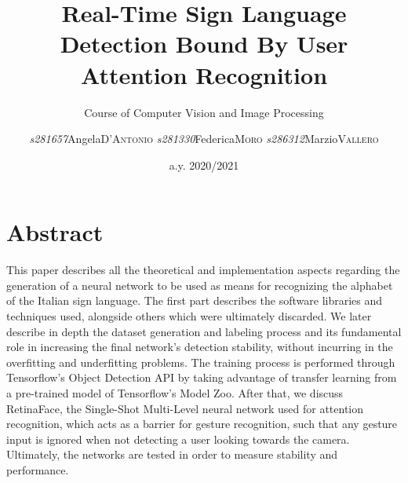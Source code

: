 \documentclass[a4paper, 12pt]{article}
\institute{Politecnico di Torino}
\title{Real-Time Sign Language Detection Bound By User Attention Recognition }
\subtitle{Course of Computer Vision and Image Processing}
\author{\textit{s281657}\quad Angela\quad \textsc{D'Antonio}\linebreak
        \textit{s281330}\quad Federica\quad \textsc{Moro}\linebreak
        \textit{s286312}\quad Marzio\quad \textsc{Vallero}\linebreak}
\date{a.y. 2020/2021}
\begin{document}
\maketitle
\romantableofcontents
\sloppy
\twocolumn

\section{Abstract}
\label{Abstract}
This paper describes all the theoretical and implementation aspects regarding the generation of a neural network to be used as means for recognizing the alphabet of the Italian sign language.
The first part describes the software libraries and techniques used, alongside others which were ultimately discarded.
We later describe in depth the dataset generation and labeling process and its fundamental role in increasing the final network's detection stability, without incurring in the overfitting and underfitting problems.
The training process is performed through Tensorflow's Object Detection API by taking advantage of transfer learning from a pre-trained model of Tensorflow's Model Zoo.
After that, we discuss RetinaFace, the Single-Shot Multi-Level neural network used for attention recognition, which acts as a barrier for gesture recognition, such that any gesture input is ignored when not detecting a user looking towards the camera.
Ultimately, the networks are tested in order to measure stability and performance.
\end{document}
